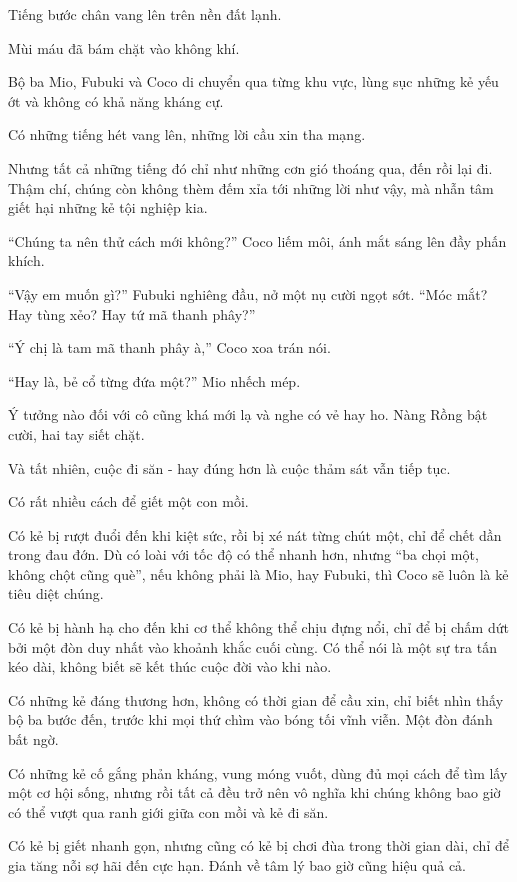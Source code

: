 \documentclass[../main.tex]{subfiles}
\begin{document}
Tiếng bước chân vang lên trên nền đất lạnh.

Mùi máu đã bám chặt vào không khí.

Bộ ba Mio, Fubuki và Coco di chuyển qua từng khu vực, lùng sục những kẻ yếu ớt và không có khả năng kháng cự.

Có những tiếng hét vang lên, những lời cầu xin tha mạng.

Nhưng tất cả những tiếng đó chỉ như những cơn gió thoáng qua, đến rồi lại đi. Thậm chí, chúng còn không thèm đếm xỉa tới những lời như vậy, mà nhẫn tâm giết hại những kẻ tội nghiệp kia.

``Chúng ta nên thử cách mới không?'' Coco liếm môi, ánh mắt sáng lên đầy phấn khích.

``Vậy em muốn gì?'' Fubuki nghiêng đầu, nở một nụ cười ngọt sớt. ``Móc mắt? Hay tùng xẻo? Hay tứ mã thanh phây?''

``Ý chị là tam mã thanh phây à,'' Coco xoa trán nói.

``Hay là, bẻ cổ từng đứa một?'' Mio nhếch mép.

Ý tưởng nào đối với cô cũng khá mới lạ và nghe có vẻ hay ho. Nàng Rồng bật cười, hai tay siết chặt.

Và tất nhiên, cuộc đi săn - hay đúng hơn là cuộc thảm sát vẫn tiếp tục.

\il

Có rất nhiều cách để giết một con mồi.

Có kẻ bị rượt đuổi đến khi kiệt sức, rồi bị xé nát từng chút một, chỉ để chết dần trong đau đớn. Dù có loài với tốc độ có thể nhanh hơn, nhưng ``ba chọi một, không chột cũng què'', nếu không phải là Mio, hay Fubuki, thì Coco sẽ luôn là kẻ tiêu diệt chúng.

Có kẻ bị hành hạ cho đến khi cơ thể không thể chịu đựng nổi, chỉ để bị chấm dứt bởi một đòn duy nhất vào khoảnh khắc cuối cùng. Có thể nói là một sự tra tấn kéo dài, không biết sẽ kết thúc cuộc đời vào khi nào.

Có những kẻ đáng thương hơn, không có thời gian để cầu xin, chỉ biết nhìn thấy bộ ba bước đến, trước khi mọi thứ chìm vào bóng tối vĩnh viễn. Một đòn đánh bất ngờ.

Có những kẻ cố gắng phản kháng, vung móng vuốt, dùng đủ mọi cách để tìm lấy một cơ hội sống, nhưng rồi tất cả đều trở nên vô nghĩa khi chúng không bao giờ có thể vượt qua ranh giới giữa con mồi và kẻ đi săn.

Có kẻ bị giết nhanh gọn, nhưng cũng có kẻ bị chơi đùa trong thời gian dài, chỉ để gia tăng nỗi sợ hãi đến cực hạn. Đánh về tâm lý bao giờ cũng hiệu quả cả.
\end{document}
